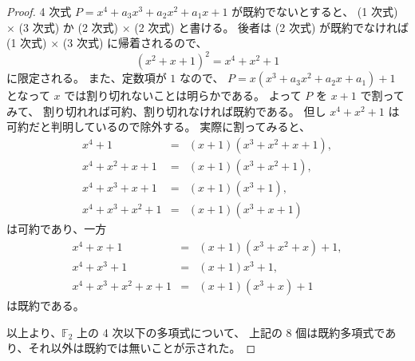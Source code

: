 \begin{proof}
4 次式 $P = x^4 + a_3 x^3 + a_2 x^2 + a_1 x + 1$ が既約でないとすると、
(1 次式) $\times$ (3 次式)
か
(2 次式) $\times$ (2 次式)
と書ける。
後者は (2 次式) が既約でなければ
(1 次式) $\times$ (3 次式)
に帰着されるので、
\begin{equation}
(x^2 + x + 1)^2 = x^4 + x^2 + 1
\end{equation}
に限定される。
また、定数項が $1$ なので、
$P = x (x^3 + a_3 x^2 + a_2 x + a_1) + 1$
となって $x$ では割り切れないことは明らかである。
よって $P$ を $x+1$ で割ってみて、
割り切れれば可約、割り切れなければ既約である。
但し $x^4 + x^2 + 1$ は可約だと判明しているので除外する。
実際に割ってみると、
\begin{eqnarray}
x^4 + 1 &=& (x + 1) (x^3 + x^2 + x + 1), \\
x^4 + x^2 + x + 1 &=& (x + 1) (x^3 + x^2 + 1), \\
x^4 + x^3 + x + 1 &=& (x + 1) (x^3 + 1), \\
x^4 + x^3 + x^2 + 1 &=& (x + 1) (x^3 + x + 1)
\end{eqnarray}
は可約であり、一方
\begin{eqnarray}
x^4 + x + 1 &=& (x + 1) (x^3 + x^2 + x) + 1, \\
x^4 + x^3 + 1 &=& (x + 1) x^3 + 1, \\
x^4 + x^3 + x^2 + x + 1 &=& (x + 1) (x^3 + x) + 1
\end{eqnarray}
は既約である。

以上より、$\mathbb{F}_2$ 上の 4 次以下の多項式について、
上記の 8 個は既約多項式であり、それ以外は既約では無いことが示された。
\end{proof}
